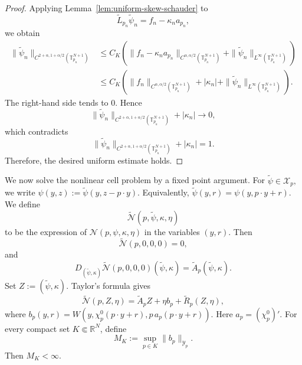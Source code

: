 \documentclass[preprint]{elsarticle}
\numberwithin{equation}{section}
\begin{document}
\begin{proof}
Applying Lemma~\ref{lem:uniform-skew-schauder} to
\begin{equation*}
\widetilde L_{p_n}\widetilde\psi_n
=
f_n-\kappa_n a_{p_n},
\end{equation*}
we obtain
\begin{equation}
\begin{aligned}
\|\widetilde\psi_n\|_{C^{2+\alpha,1+\alpha/2}(\mathbb T_{p_n}^{N+1})}
&\le
C_K
\left(
\|f_n-\kappa_n a_{p_n}\|_{C^{\alpha,\alpha/2}(\mathbb T_{p_n}^{N+1})}
+
\|\widetilde\psi_n\|_{L^\infty(\mathbb T_{p_n}^{N+1})}
\right)
\\
&\le
C_K
\left(
\|f_n\|_{C^{\alpha,\alpha/2}(\mathbb T_{p_n}^{N+1})}
+
|\kappa_n|
+
\|\widetilde\psi_n\|_{L^\infty(\mathbb T_{p_n}^{N+1})}
\right).
\end{aligned}
\end{equation}
The right-hand side tends to $0$. Hence
\begin{equation*}
\|\widetilde\psi_n\|_{C^{2+\alpha,1+\alpha/2}(\mathbb T_{p_n}^{N+1})}
+
|\kappa_n|
\to0,
\end{equation*}
which contradicts
\begin{equation*}
\|\widetilde\psi_n\|_{C^{2+\alpha,1+\alpha/2}(\mathbb T_{p_n}^{N+1})}
+
|\kappa_n|
=1.
\end{equation*}
Therefore, the desired uniform estimate holds.
\end{proof}

We now solve the nonlinear cell problem by a fixed point argument. For
$
\widetilde\psi\in\mathcal X_p,
$
we write
$
\psi(y,z):=\widetilde\psi(y,z-p\cdot y).
$
Equivalently,
$
\widetilde\psi(y,r)=\psi(y,p\cdot y+r).
$
We define
$$
\widetilde{\mathcal N}(p,\widetilde\psi,\kappa,\eta)
$$
to be the expression of
$
\mathcal N(p,\psi,\kappa,\eta)
$
in the variables $(y,r)$. Then
\begin{equation*}
\widetilde{\mathcal N}(p,0,0,0)=0,
\end{equation*}
and
\begin{equation*}
D_{(\widetilde\psi,\kappa)}
\widetilde{\mathcal N}(p,0,0,0)(\widetilde\psi,\kappa)
=
\widetilde A_p(\widetilde\psi,\kappa).
\end{equation*}
Set
$
Z:=(\widetilde\psi,\kappa).
$
Taylor's formula gives
\begin{equation*}
\widetilde{\mathcal N}(p,Z,\eta)
=
\widetilde A_pZ
+
\eta b_p
+
\widetilde R_p(Z,\eta),
\end{equation*}
where $b_p(y,r)
=
W\left(
y,
\chi_p^0(p\cdot y+r),
p\,a_p(p\cdot y+r)
\right).$
Here
$
a_p=(\chi_p^0)'.
$
For every compact set $K\Subset\mathbb R^N$, define
\begin{equation*}
M_K:=
\sup_{p\in K}\|b_p\|_{\mathcal Y_p}.
\end{equation*}
Then $M_K<\infty$.
\end{document}

